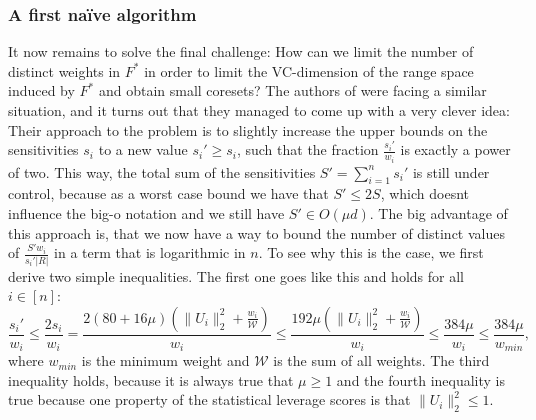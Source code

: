 \subsubsection{A first na\"ive algorithm}

It now remains to solve the final challenge: How can we limit the
number of distinct weights in $F^\ast$ in order to limit
the VC-dimension of the range space induced by $F^\ast$ and obtain
small coresets? The authors of \cite{on-coresets} were facing
a similar situation, and it turns out that they managed to come
up with a very clever idea: Their approach to the problem is to
slightly increase the upper bounds on the sensitivities $s_i$ to
a new value $s_i' \geq s_i$, such that the fraction $\frac{s_i'}{w_i}$ is
exactly a power of two. This way, the total sum of the sensitivities
$S' = \sum_{i=1}^n s_i'$ is still under control, because as a worst
case bound we have that $S' \leq 2 S$, which doesnt influence the
big-o notation and we still have $S' \in O(\mu d)$.
The big advantage of this approach is, that we now have a way
to bound the number of distinct values of $\frac{S'w_i}{s_i' |R|}$
in a term that is logarithmic in $n$.
To see why this is the case, we first derive two simple
inequalities. The first one goes like this and holds for all
$i \in [n]$:
\begin{equation*}
    \frac{s_i'}{w_i} \leq \frac{2 s_i}{w_i}
    = \frac{2 (80 + 16\mu)(\lVert U_i \rVert_2^2 + \frac{w_i}{\mathcal{W}})}{w_i}
    \leq \frac{192\mu (\lVert U_i \rVert_2^2 + \frac{w_i}{\mathcal{W}})}{w_i}
    \leq \frac{384 \mu}{w_i}
    \leq \frac{384 \mu}{w_{min}},
\end{equation*}
where $w_{min}$ is the minimum weight and $\mathcal{W}$ is the sum
of all weights. The third inequality holds, because it is
always true that $\mu \geq 1$ and the fourth inequality is true because
one property of the statistical leverage scores
is that $\lVert U_i \rVert_2^2 \leq 1$.

